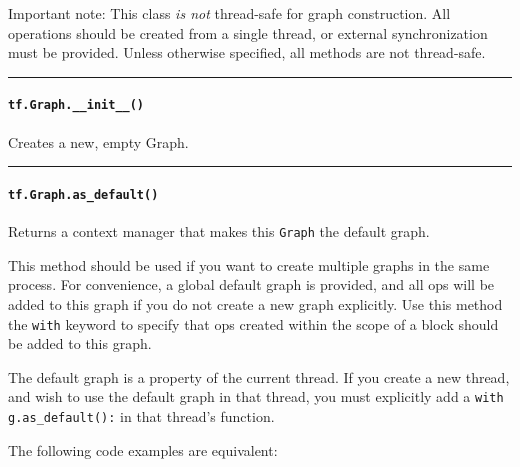 Important note: This class \emph{is not} thread-safe for graph
construction. All operations should be created from a single thread, or
external synchronization must be provided. Unless otherwise specified,
all methods are not thread-safe.

\begin{center}\rule{0.5\linewidth}{\linethickness}\end{center}

\paragraph{\texorpdfstring{\lstinline{tf.Graph.__init__()}
}{tf.Graph.__init__() }}\label{tf.graph.ux5fux5finitux5fux5f}

Creates a new, empty Graph.

\begin{center}\rule{0.5\linewidth}{\linethickness}\end{center}

\paragraph{\texorpdfstring{\lstinline{tf.Graph.as_default()}
}{tf.Graph.as_default() }}\label{tf.graph.asux5fdefault}

Returns a context manager that makes this \lstinline{Graph} the default
graph.

This method should be used if you want to create multiple graphs in the
same process. For convenience, a global default graph is provided, and
all ops will be added to this graph if you do not create a new graph
explicitly. Use this method the \lstinline{with} keyword to specify that
ops created within the scope of a block should be added to this graph.

The default graph is a property of the current thread. If you create a
new thread, and wish to use the default graph in that thread, you must
explicitly add a \lstinline{with g.as_default():} in that thread's
function.

The following code examples are equivalent:

\begin{Shaded}
\begin{Highlighting}[]
\OperatorTok{=} 
 
  \OperatorTok{=} \NormalTok{)}
    

  
  \OperatorTok{=} \NormalTok{)}
    
\end{Highlighting}
\end{Shaded}

